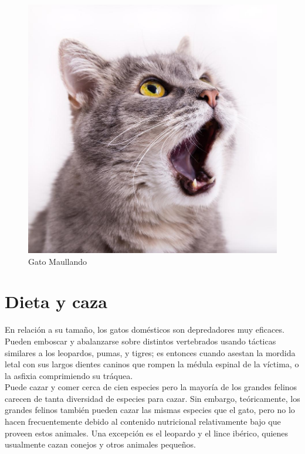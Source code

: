 \documentclass[a4paper]{article}
\begin{document}
\begin{figure}[h!]
\centering
\includegraphics[scale=0.3]{gato2.jpg}
\caption{Gato Maullando}
\label{fig:Gato2}
\end{figure}












\pagebreak



\section{Dieta y caza}

En relación a su tamaño, los gatos domésticos son depredadores muy eficaces. Pueden emboscar y abalanzarse sobre distintos vertebrados usando tácticas similares a los leopardos, pumas, y tigres; es entonces cuando asestan la mordida letal con sus largos dientes caninos que rompen la médula espinal de la víctima, o la asfixia comprimiendo su tráquea. \\

Puede cazar y comer cerca de cien especies pero la mayoría de los grandes felinos carecen de tanta diversidad de especies para cazar. Sin embargo, teóricamente, los grandes felinos también pueden cazar las mismas especies que el gato, pero no lo hacen frecuentemente debido al contenido nutricional relativamente bajo que proveen estos animales. Una excepción es el leopardo y el lince ibérico, quienes usualmente cazan conejos y otros animales pequeños.\\
\end{document}
